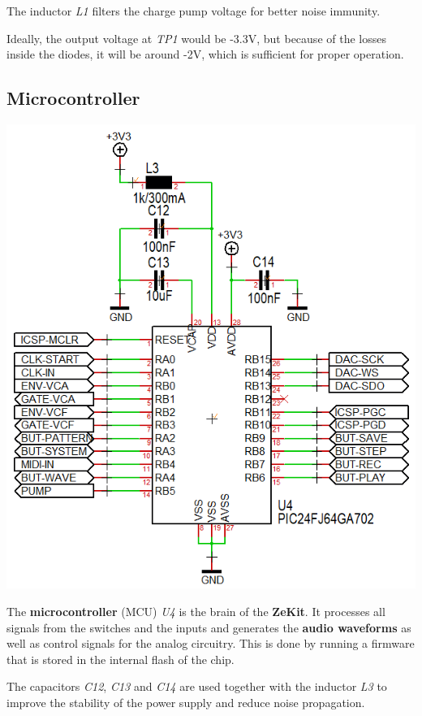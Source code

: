 \documentclass{scrartcl}
\begin{document}
The inductor \emph{L1} filters the charge pump voltage for better noise immunity.

Ideally, the output voltage at \emph{TP1} would be -3.3V, but because of the losses inside the diodes, it will be around -2V, which is sufficient for proper operation.

\subsection{Microcontroller}

\begin{center}
    \includegraphics[scale=0.50]{assets/schema-mcu.png}
\end{center}

The \textbf{microcontroller} (MCU) \emph{U4} is the brain of the \textbf{ZeKit}. It processes all signals from the switches and the inputs and generates the \textbf{audio waveforms} as well as control signals for the analog circuitry. This is done by running a firmware that is stored in the internal flash of the chip.

The capacitors \emph{C12}, \emph{C13} and \emph{C14} are used together with the inductor \emph{L3} to improve the stability of the power supply and reduce noise propagation.
\end{document}
